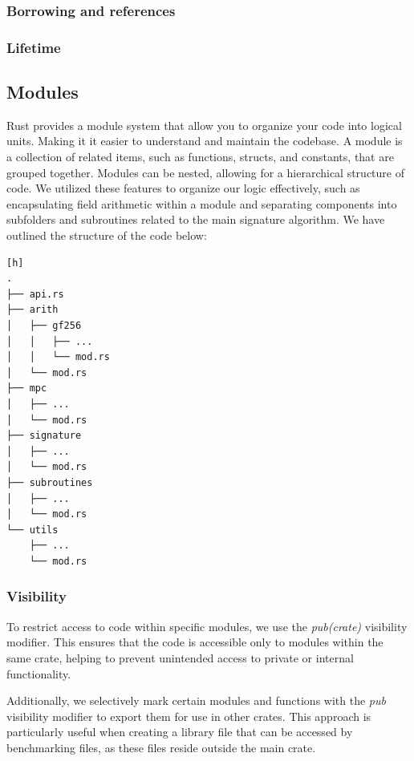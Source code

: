 \documentclass[twoside,11pt]{report}
\theoremstyle{definition}
\theoremstyle{plain}
\begin{document}
\subsubsection{Borrowing and references}

\subsubsection{Lifetime}

\subsection{Modules}
Rust provides a module system that allow you to organize your code into logical units. Making it it easier to understand and maintain the codebase. A module is a collection of related items, such as functions, structs, and constants, that are grouped together. Modules can be nested, allowing for a hierarchical structure of code.
We utilized these features to organize our logic effectively, such as encapsulating field arithmetic within a module and separating components into subfolders and subroutines related to the main signature algorithm.
We have outlined the structure of the code below:
\begin{lstlisting}[style=tree][h]
.
├── api.rs
├── arith
│   ├── gf256
│   │   ├── ...
│   │   └── mod.rs
│   └── mod.rs
├── mpc
│   ├── ...
│   └── mod.rs
├── signature
│   ├── ...
│   └── mod.rs
├── subroutines
│   ├── ...
│   └── mod.rs
└── utils
    ├── ...
    └── mod.rs
\end{lstlisting}
\subsubsection{Visibility} %
To restrict access to code within specific modules, we use the \textit{pub(crate)} visibility modifier. This ensures that the code is accessible only to modules within the same crate, helping to prevent unintended access to private or internal functionality.

Additionally, we selectively mark certain modules and functions with the \textit{pub} visibility modifier to export them for use in other crates. This approach is particularly useful when creating a library file that can be accessed by benchmarking files, as these files reside outside the main crate.
\end{document}
